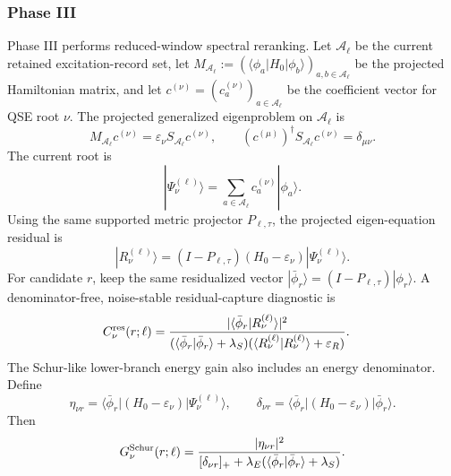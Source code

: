 \documentclass[
  reprint,
  amsmath,
  amssymb,
  aps,
  pra,
  nofootinbib,
  superscriptaddress,
  floatfix
]{revtex4-2}
\newcommand{\Acal}{\mathcal{A}}
\newcommand{\eps}{\varepsilon}
\newcommand{\ket}[1]{|#1\rangle}
\newcommand{\bra}[1]{\langle #1|}
\newcommand{\braket}[2]{\langle #1|#2\rangle}
\begin{document}
\subsubsection{Phase III}

Phase III performs reduced-window spectral reranking.  Let $\Acal_\ell$ be the current retained excitation-record set, let
$M_{\Acal_\ell}:=(\bra{\phi_a}H_0\ket{\phi_b})_{a,b\in\Acal_\ell}$ be the projected Hamiltonian matrix, and let $c^{(\nu)}=(c_a^{(\nu)})_{a\in\Acal_\ell}$ be the coefficient vector for QSE root $\nu$.  The projected generalized eigenproblem on $\Acal_\ell$ is
\begin{equation}
M_{\Acal_\ell}c^{(\nu)}=\varepsilon_\nu S_{\Acal_\ell}c^{(\nu)},
\qquad
(c^{(\mu)})^\dagger S_{\Acal_\ell}c^{(\nu)}=\delta_{\mu\nu}.
\label{eq:qse_phase3_gep}
\end{equation}
The current root is
\begin{equation}
\ket{\Psi_\nu^{(\ell)}}=
\sum_{a\in\Acal_\ell}c_a^{(\nu)}\ket{\phi_a}.
\label{eq:qse_current_root}
\end{equation}
Using the same supported metric projector $P_{\ell,\tau}$, the projected eigen-equation residual is
\begin{equation}
\ket{R_\nu^{(\ell)}}=
(I-P_{\ell,\tau})(H_0-\varepsilon_\nu)\ket{\Psi_\nu^{(\ell)}}.
\label{eq:qse_eigen_residual}
\end{equation}
For candidate $r$, keep the same residualized vector $\ket{\bar\phi_r}=(I-P_{\ell,\tau})\ket{\phi_r}$.  A denominator-free, noise-stable residual-capture diagnostic is
\begin{equation}
\begin{aligned}
C_\nu^{\rm res}(r;\ell)
&=
\frac{
|\bra{\bar\phi_r}R_\nu^{(\ell)}\rangle|^2
}{
(\braket{\bar\phi_r}{\bar\phi_r}+\lambda_S)
(\braket{R_\nu^{(\ell)}}{R_\nu^{(\ell)}}+\eps_R)
}.
\end{aligned}
\label{eq:qse_residual_capture}
\end{equation}
The Schur-like lower-branch energy gain also includes an energy denominator.  Define
\begin{equation}
\eta_{\nu r}
=
\bra{\bar\phi_r}(H_0-\varepsilon_\nu)\ket{\Psi_\nu^{(\ell)}},
\qquad
\delta_{\nu r}
=
\bra{\bar\phi_r}(H_0-\varepsilon_\nu)\ket{\bar\phi_r}.
\label{eq:qse_schur_parts}
\end{equation}
Then
\begin{equation}
G_\nu^{\rm Schur}(r;\ell)
=
\frac{
|\eta_{\nu r}|^2
}{
[\delta_{\nu r}]_+
+\lambda_E(\braket{\bar\phi_r}{\bar\phi_r}+\lambda_S)
}.
\label{eq:qse_schur_gain}
\end{equation}
\end{document}
